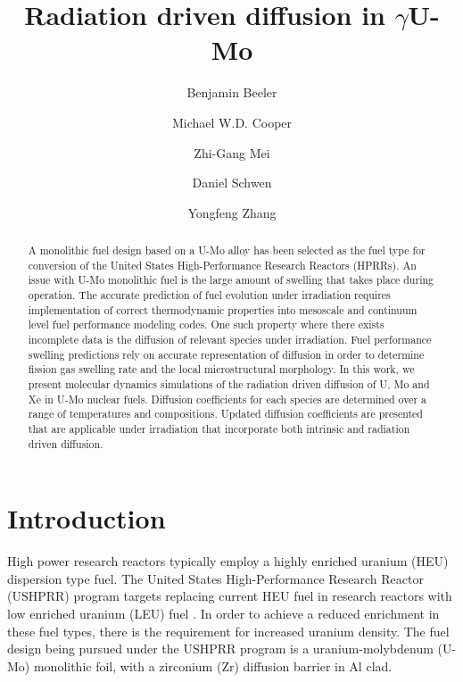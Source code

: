 \documentclass[review]{elsarticle}
\begin{document}
\begin{frontmatter}
\title{Radiation driven diffusion in $\gamma$U-Mo}

\author[inl]{Benjamin Beeler}
\author[lanl]{Michael W.D. Cooper}
\author[anl]{Zhi-Gang Mei}
\author[inl]{Daniel Schwen}
\author[inl]{Yongfeng Zhang}
\address[inl]{Idaho National Laboratory, Idaho Falls, ID 83415}
\address[lanl]{Los Alamos National Laboratory, Los Alamos, NM 87545}
\address[anl]{Argonne National Laboratory, Lemont, IL 60439}

\begin{abstract}
A monolithic fuel design based on a U-Mo alloy has been selected as the fuel type for conversion of the United States High-Performance Research Reactors (HPRRs). An issue with U-Mo monolithic fuel is the large amount of swelling that takes place during operation. The accurate prediction of fuel evolution under irradiation requires implementation of correct thermodynamic properties into mesoscale and continuum level fuel performance modeling codes. One such property where there exists incomplete data is the diffusion of relevant species under irradiation. Fuel performance swelling predictions rely on accurate representation of diffusion in order to determine fission gas swelling rate and the local microstructural morphology. In this work, we present molecular dynamics simulations of the radiation driven diffusion of U, Mo and Xe in U-Mo nuclear fuels. Diffusion coefficients for each species are determined over a range of temperatures and compositions. Updated diffusion coefficients are presented that are applicable under irradiation that incorporate both intrinsic and radiation driven diffusion. 


\end{abstract}
\end{frontmatter}

\linenumbers
\modulolinenumbers[5]

\section{Introduction}

High power research reactors typically employ a highly enriched uranium (HEU) dispersion type fuel. The United States High-Performance Research Reactor (USHPRR) program targets replacing current HEU fuel in research reactors with low enriched uranium (LEU) fuel \cite{snelgrove1997}. In order to achieve a reduced enrichment in these fuel types, there is the requirement for increased uranium density. The fuel design being pursued under the USHPRR program is a uranium-molybdenum (U-Mo) monolithic foil, with a zirconium (Zr) diffusion barrier in Al clad.
\end{document}
